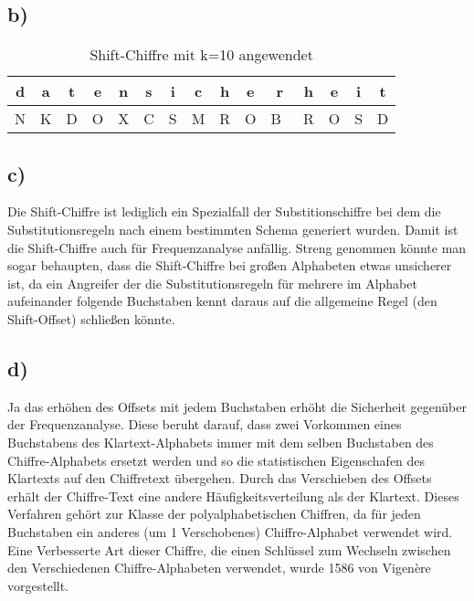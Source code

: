 \documentclass[10pt,a4paper]{article}
\begin{document}
\subsection*{b)}
\begin{table}[htdp]
\caption{Shift-Chiffre mit k=10 angewendet}
\begin{center}
\begin{tabular}{|c|c|c|c|c|c|c|c|c|c|c|c|c|c|c|}
	d & a &  t & e & n & s & i & c & h & e & r & h & e  & i & t \\ \hline
	 N & K & D & O & X & C & S & M & R & O & B\ & R & O & S & D \\ \hline
\end{tabular}
\end{center}
\label{default}
\end{table}%
\subsection*{c)}
Die Shift-Chiffre ist lediglich ein Spezialfall der Substitionschiffre bei dem die Substitutionsregeln nach einem bestimmten Schema generiert wurden. Damit ist die Shift-Chiffre auch für Frequenzanalyse anfällig. Streng genommen könnte man sogar behaupten, dass die Shift-Chiffre bei großen Alphabeten etwas unsicherer ist, da ein Angreifer der die Substitutionsregeln für mehrere im Alphabet aufeinander folgende Buchstaben kennt daraus auf die allgemeine Regel (den Shift-Offset) schließen könnte.
\subsection*{d)}
Ja das erhöhen des Offsets mit jedem Buchstaben erhöht die Sicherheit gegenüber der Frequenzanalyse. Diese beruht darauf, dass zwei Vorkommen eines Buchstabens des Klartext-Alphabets immer mit dem selben Buchstaben des Chiffre-Alphabets ersetzt werden und so die statistischen Eigenschafen des Klartexts auf den Chiffretext übergehen. Durch das Verschieben des Offsets erhält der Chiffre-Text eine andere Häufigkeitsverteilung als der Klartext. Dieses Verfahren gehört zur Klasse der polyalphabetischen Chiffren, da für jeden Buchstaben ein anderes (um 1 Verschobenes) Chiffre-Alphabet verwendet wird. Eine Verbesserte Art dieser Chiffre, die einen Schlüssel zum Wechseln zwischen den Verschiedenen Chiffre-Alphabeten verwendet, wurde 1586 von Vigenère vorgestellt.
\end{document}
